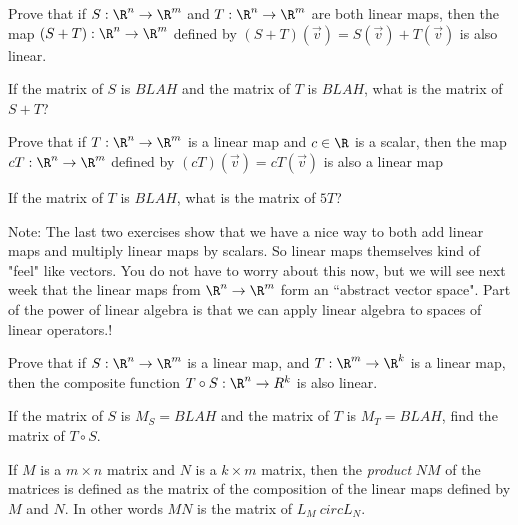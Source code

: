 	\begin{question}
		Prove that if $S:\R^n \to\R^m$ and $T:\R^n \to \R^m$ are both linear maps, 
		then the map $(S+T):\R^n \to\R^m$ defined by $(S+T)(\vec{v}) = S(\vec{v})+T(\vec{v})$ is also linear.
	\end{question}
	
	\begin{question}
		If the matrix of $S$ is $BLAH$ and the matrix of $T$ is $BLAH$, what is the matrix of $S+T$?
	\end{question}
	
	\begin{question}
		Prove that if $T:\R^n \to \R^m$ is a linear map and $c \in \R$ is a scalar, then the map $cT:\R^n \to \R^m$  defined by $(cT)(\vec{v}) = cT(\vec{v})$ is also 
		a linear map
	\end{question}
	
	\begin{question}
		If the matrix of $T$ is $BLAH$, what is the matrix of $5T$?
	\end{question}
	
	Note:  The last two exercises show that we have a nice way to both add linear maps and multiply linear maps by scalars.  So linear maps themselves kind of "feel" like
	vectors.  You do not have to worry about this now, but we will see next week that the linear maps from $\R^n \to \R^m$ form an ``abstract vector space".  Part of the 
	power of linear algebra is that we can apply linear algebra to spaces of linear operators.!	
	
	\begin{question}
		Prove that if $S:\R^n \to \R^m$ is a linear map, and $T:\R^m \to \R^k$ is a linear map, then the composite function $T\circ S:\R^n \to R^k$ is also linear.
	\end{question}
	
	\begin{question}
		If the matrix of $S$ is $M_S = BLAH$ and the matrix of $T$ is $M_T = BLAH$, find the matrix of $T \circ S$.
	\end{question}
	
	\begin{definition}
		If $M$ is a $m\times n$ matrix and $N$ is a $k \times m$ matrix, then the \textit{product} $NM$ of the matrices is
		defined as the matrix of the composition of the linear maps defined by $M$ and $N$.  In other words  $MN$ is the matrix of 
		$L_M\ circ L_N$.
	\end{definition}
	
